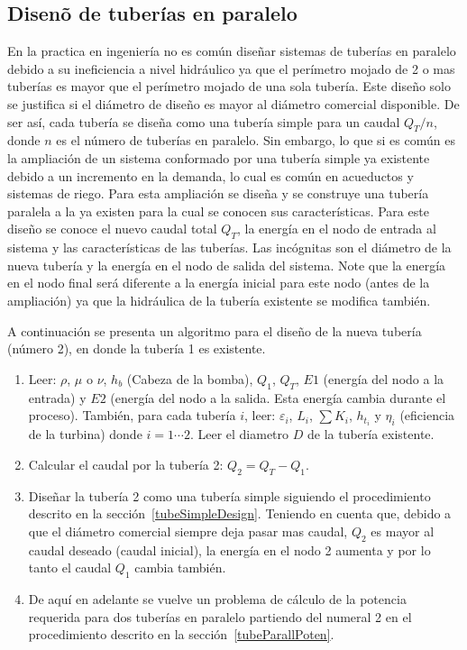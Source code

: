 \documentclass[11pt, oneside]{article}
\begin{document}
\subsection{Disen\~o de  tuber\'ias en paralelo}
En la practica en ingenier\'ia no es com\'un dise\~nar sistemas de tuber\'ias en paralelo debido a su ineficiencia a nivel hidr\'aulico ya que el per\'imetro mojado de 2 o mas tuber\'ias es mayor que el per\'imetro mojado de una sola tuber\'ia. Este dise\~no solo se justifica si el di\'ametro de dise\~no es mayor al di\'ametro comercial disponible. De ser as\'i, cada tuber\'ia se dise\~na como una tuber\'ia simple para un caudal $Q_T/n$, donde $n$ es el n\'umero de tuber\'ias en paralelo. Sin embargo, lo que si es com\'un es la ampliaci\'on de un sistema conformado por una tuber\'ia simple ya existente debido a un incremento en la demanda, lo cual es com\'un en acueductos y sistemas de riego. Para esta ampliaci\'on se dise\~na y se construye una tuber\'ia paralela a la ya existen para la cual se conocen sus caracter\'isticas. Para este dise\~no se conoce el nuevo caudal total $Q_T$, la energ\'ia en el nodo de entrada al sistema y las caracter\'isticas de las tuber\'ias. Las inc\'ognitas son el di\'ametro de la nueva tuber\'ia y la energ\'ia en el nodo de salida del sistema. Note que la energ\'ia en el nodo final ser\'a diferente a la energ\'ia inicial para este nodo (antes de la ampliaci\'on) ya que la hidr\'aulica de la tuber\'ia existente se modifica tambi\'en.

A continuaci\'on se presenta un algoritmo para el dise\~no de la nueva tuber\'ia (n\'umero 2), en donde la tuber\'ia 1 es existente.

\begin{enumerate}
\item Leer: $\rho$, $\mu$ o $\nu$, $h_b$ (Cabeza de la bomba), $Q_1$, $Q_T$, $E1$ (energ\'ia del nodo a la entrada) y $E2$ (energ\'ia del nodo a la salida. Esta energ\'ia cambia durante el proceso). Tambi\'en, para cada tuber\'ia $i$, leer: $\varepsilon_i$, $L_i$, $\sum K_i$, $h_{t_i}$ y $\eta_i$ (eficiencia de la turbina) donde $i=1 \cdots 2$. Leer el diametro $D$ de la tuber\'ia existente.
\item Calcular el caudal por la tuber\'ia 2: $Q_2 = Q_T - Q_1$.
\item Dise\~nar la tuber\'ia 2 como una tuber\'ia simple siguiendo el procedimiento descrito en la secci\'on~\ref{tubeSimpleDesign}. Teniendo en cuenta que, debido a que el di\'ametro comercial siempre deja pasar mas caudal, $Q_2$ es mayor al caudal deseado (caudal inicial), la energ\'ia en el nodo 2 aumenta y por lo tanto el caudal $Q_1$ cambia tambi\'en.
\item De aqu\'i en adelante se vuelve un problema de c\'alculo de la potencia requerida para dos tuber\'ias en paralelo partiendo del numeral 2 en el procedimiento descrito en la secci\'on~\ref{tubeParallPoten}. 
\end{enumerate}
\end{document}

